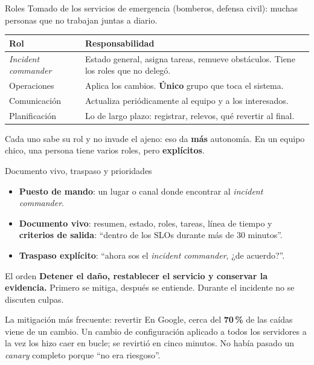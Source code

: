 \documentclass[institutional,screen,none]{ua-engineering-v6-beamer}
\begin{document}
\begin{frame}{Roles}
Tomado de los servicios de emergencia (bomberos, defensa civil): muchas personas que no trabajan juntas a diario.

\begin{center}
\small
\begin{tabular}{p{}p{}}
\toprule
\textbf{Rol} & \textbf{Responsabilidad} \\
\midrule
\emph{Incident commander} & Estado general, asigna tareas, remueve obstáculos. Tiene los roles que no delegó. \\
Operaciones & Aplica los cambios. \textbf{Único} grupo que toca el sistema. \\
Comunicación & Actualiza periódicamente al equipo y a los interesados. \\
Planificación & Lo de largo plazo: registrar, relevos, qué revertir al final. \\
\bottomrule
\end{tabular}
\end{center}

\pause

{\small Cada uno sabe su rol y no invade el ajeno: eso da \textbf{más} autonomía. En un equipo chico, una persona tiene varios roles, pero \textbf{explícitos}.}
\end{frame}

\begin{frame}{Documento vivo, traspaso y prioridades}
\begin{itemize}\small
\item \textbf{Puesto de mando}: un lugar o canal donde encontrar al \emph{incident commander}.
\item \textbf{Documento vivo}: resumen, estado, roles, tareas, línea de tiempo y \textbf{criterios de salida}: ``dentro de los SLOs durante más de 30 minutos''.
\item \textbf{Traspaso explícito}: ``ahora sos el \emph{incident commander}, ¿de acuerdo?''.
\end{itemize}

\pause

\begin{block}{El orden}
\textbf{Detener el daño, restablecer el servicio y conservar la evidencia.} Primero se mitiga, después se entiende. Durante el incidente no se discuten culpas.
\end{block}

\pause

\begin{alertblock}{La mitigación más frecuente: revertir}
En Google, cerca del \textbf{70\,\%} de las caídas viene de un cambio. Un cambio de configuración aplicado a todos los servidores a la vez los hizo caer en bucle; se revirtió en cinco minutos. No había pasado un \emph{canary} completo porque ``no era riesgoso''.
\end{alertblock}
\end{frame}
\end{document}
